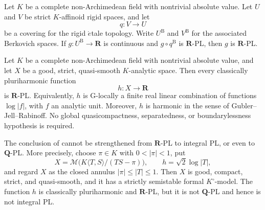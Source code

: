 
\begin{lemma}
\label{lem:p061-rigid-etale-rpl-descent}
Let \(K\) be a complete non-Archimedean field with nontrivial absolute
value.  Let \(U\) and \(V\) be strict \(K\)-affinoid rigid spaces, and let
\[
                         q:V\longrightarrow U
\]
be a covering for the rigid \(\acute{e}\)tale topology.  Write
\(U^{\mathrm B}\) and \(V^{\mathrm B}\) for the associated Berkovich
spaces.  If \(g:U^{\mathrm B}\to\mathbf R\) is continuous and
\(g\circ q^{\mathrm B}\) is \(\mathbf R\)-PL, then \(g\) is
\(\mathbf R\)-PL.
\end{lemma}

\begin{theorem}
\label{thm:p061-quasismooth-ph-rpl}
Let \(K\) be a complete non-Archimedean field with nontrivial absolute
value, and let \(X\) be a good, strict, quasi-smooth \(K\)-analytic space.
Then every classically pluriharmonic function
\[
                             h:X\longrightarrow\mathbf R
\]
is \(\mathbf R\)-PL.  Equivalently, \(h\) is G-locally a finite real
linear combination of functions \(\log|f|\), with \(f\) an analytic unit.
Moreover, \(h\) is harmonic in the sense of
Gubler--Jell--Rabinoff.  No global quasicompactness, separatedness, or
boundarylessness hypothesis is required.
\end{theorem}

\begin{proposition}
\label{prop:p061-integral-pl-counterexample}
The conclusion of  cannot be strengthened
from \(\mathbf R\)-PL to integral PL, or even to \(\mathbf Q\)-PL.  More
precisely, choose
\(\pi\in K\) with \(0<|\pi|<1\), put
\[
 X=\mathcal M\bigl(K\langle T,S\rangle/(TS-\pi)\bigr),
 \qquad h=\sqrt2\log|T|,
\]
and regard \(X\) as the closed annulus \(|\pi|\leq |T|\leq1\).  Then \(X\)
is good, compact, strict, and quasi-smooth, and it has a strictly semistable
formal \(K^\circ\)-model.  The function \(h\) is classically
pluriharmonic and \(\mathbf R\)-PL, but it is not \(\mathbf Q\)-PL and hence
is not integral PL.
\end{proposition}
